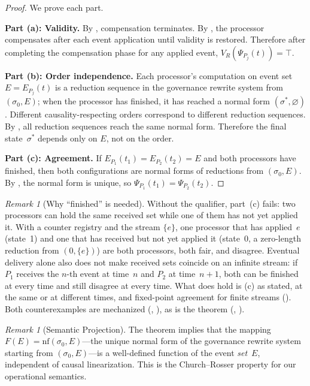 \documentclass[11pt,a4paper]{article}
\theoremstyle{plain}
\theoremstyle{definition}
\theoremstyle{remark}
\newtheorem{remark}[theorem]{Remark}
\newcommand{\nf}{\mathrm{nf}}
\begin{document}
\begin{proof}
We prove each part.

\medskip\noindent\textbf{Part (a): Validity.}\;
By , compensation terminates.  By
, the processor compensates after each event
application until validity is restored.  Therefore after completing the
compensation phase for any applied event,
$V_R(\Psi_{P_j}(t)) = \top$.

\medskip\noindent\textbf{Part (b): Order independence.}\;
Each processor's computation on event set $E = E_{P_j}(t)$ is a reduction
sequence in the governance rewrite system from $(\sigma_0, E)$; when the
processor has finished, it has reached a normal form $(\sigma^*, \varnothing)$.
Different causality-respecting orders correspond to different reduction
sequences.  By , all reduction sequences reach the same
normal form.  Therefore the final state~$\sigma^*$ depends only on $E$, not on
the order.

\medskip\noindent\textbf{Part (c): Agreement.}\;
If $E_{P_1}(t_1) = E_{P_2}(t_2) = E$ and both processors have finished, then
both configurations are normal forms of reductions from $(\sigma_0, E)$.  By
, the normal form is unique, so
$\Psi_{P_1}(t_1) = \Psi_{P_2}(t_2)$.
\end{proof}

\begin{remark}[Why ``finished'' is needed]
\label{rem:finished}
Without the qualifier, part~(c) fails: two processors can hold the same
received set while one of them has not yet applied it.  With a counter
registry and the stream $\{e\}$, one processor that has applied~$e$ (state~1)
and one that has received but not yet applied it (state~0, a zero-length
reduction from $(0, \{e\})$) are both processors, both fair, and disagree.
Eventual delivery alone also does not make received sets coincide on an
infinite stream: if $P_1$ receives the $n$-th event at time~$n$ and $P_2$ at
time~$n+1$, both can be finished at every time and still disagree at every
time.  What does hold is (c) as stated, at the same or at different times,
and fixed-point agreement for finite streams ().  Both
counterexamples are mechanized
(,
), as is the theorem
(, ).
\end{remark}

\begin{remark}[Semantic Projection]
\label{rem:set-function}
The theorem implies that the mapping $F(E) = \nf(\sigma_0, E)$---the unique
normal form of the governance rewrite system starting from $(\sigma_0, E)$---is
a well-defined function of the event \emph{set}~$E$, independent of causal
linearization.  This is the Church--Rosser property for our operational
semantics.
\end{remark}
\end{document}
